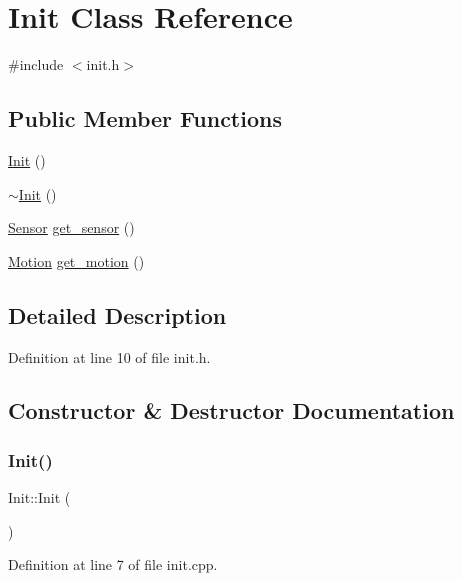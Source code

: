 \hypertarget{class_init}{}\section{Init Class Reference}
\label{class_init}


{\ttfamily \#include $<$init.\+h$>$}

\subsection*{Public Member Functions}
\begin{DoxyCompactItemize}
\item 
\mbox{\hyperlink{class_init_a06a43f2bcb930e7ebec7d383efc15fd9}{Init}} ()
\item 
\mbox{\hyperlink{class_init_a67d5c94cb965fa3b774e969cfb4969d1}{$\sim$\+Init}} ()
\item 
\mbox{\hyperlink{class_sensor}{Sensor}} \mbox{\hyperlink{class_init_a8d5597fb9e9bfb192a235cdee32ede2d}{get\+\_\+sensor}} ()
\item 
\mbox{\hyperlink{class_motion}{Motion}} \mbox{\hyperlink{class_init_a2f0137392b84da9c02d9c4d892e44534}{get\+\_\+motion}} ()
\end{DoxyCompactItemize}


\subsection{Detailed Description}


Definition at line 10 of file init.\+h.



\subsection{Constructor \& Destructor Documentation}
\mbox{\label{class_init_a06a43f2bcb930e7ebec7d383efc15fd9}} 
\subsubsection{\texorpdfstring{Init()}{Init()}}
{\footnotesize\ttfamily Init\+::\+Init (\begin{DoxyParamCaption}{ }\end{DoxyParamCaption})}



Definition at line 7 of file init.\+cpp.

